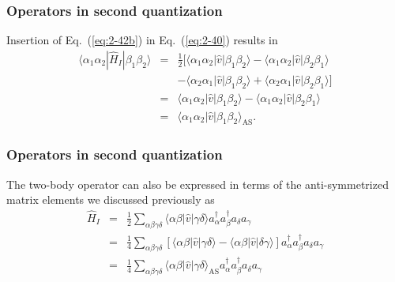 \documentclass{beamer}
\begin{document}
\begin{frame}
\frametitle{Operators in second quantization}

\begin{block}{}
Insertion of 
Eq.~(\ref{eq:2-42b}) in Eq.~(\ref{eq:2-40}) results in
\begin{eqnarray}
	\langle \alpha_1\alpha_2|\hat{H}_I|\beta_1\beta_2\rangle &=& \frac{1}{2} \big[ 
		\langle \alpha_1\alpha_2|\hat{v}|\beta_1\beta_2\rangle- \langle \alpha_1\alpha_2|\hat{v}|\beta_2\beta_1\rangle \nonumber \\
		&& - \langle \alpha_2\alpha_1|\hat{v}|\beta_1\beta_2\rangle + \langle \alpha_2\alpha_1|\hat{v}|\beta_2\beta_1\rangle \big] \nonumber \\
	&=& \langle \alpha_1\alpha_2|\hat{v}|\beta_1\beta_2\rangle - \langle \alpha_1\alpha_2|\hat{v}|\beta_2\beta_1\rangle \nonumber \\
	&=& \langle \alpha_1\alpha_2|\hat{v}|\beta_1\beta_2\rangle_{\mathrm{AS}}. \label{eq:2-43b}
\end{eqnarray}
\end{block}
\end{frame}

\begin{frame}
\frametitle{Operators in second quantization}

\begin{block}{}
The two-body operator can also be expressed in terms of the anti-symmetrized matrix elements we discussed previously as
\begin{eqnarray}
	\hat{H}_I &=& \frac{1}{2} \sum_{\alpha\beta\gamma\delta}  \langle \alpha \beta|\hat{v}|\gamma \delta\rangle
		a_\alpha^{\dagger} a_\beta^{\dagger} a_\delta a_\gamma \nonumber \\
	&=& \frac{1}{4} \sum_{\alpha\beta\gamma\delta} \left[ \langle \alpha \beta|\hat{v}|\gamma \delta\rangle -
		\langle \alpha \beta|\hat{v}|\delta\gamma \rangle \right] 
		a_\alpha^{\dagger} a_\beta^{\dagger} a_\delta a_\gamma \nonumber \\
	&=& \frac{1}{4} \sum_{\alpha\beta\gamma\delta} \langle \alpha \beta|\hat{v}|\gamma \delta\rangle_{\mathrm{AS}}
		a_\alpha^{\dagger} a_\beta^{\dagger} a_\delta a_\gamma \label{eq:2-45}
\end{eqnarray}
\end{block}
\end{frame}
\end{document}
